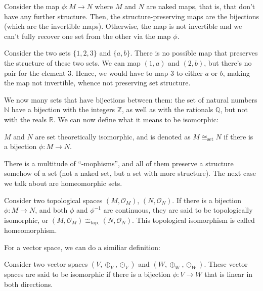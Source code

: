 Consider the map $\phi : M \longrightarrow N$ where $M$ and $N$ are naked maps, that is, that don't have any further structure. Then, the structure-preserving maps are the bijections (which are the invertible maps). Otherwise, the map is not invertible and we can't fully recover one set from the other via the map $\phi$.

\begin{example}
    Consider the two sets $\{1,2,3\}$ and $\{a,b\}$. There is no possible map that preserves the structure of these two sets. We can map $(1,a)$ and $(2,b)$, but there's no pair for the element $3$. Hence, we would have to map 3 to either $a$ or $b$, making the map not invertible, whence not preserving set structure.
    \qedwhite
\end{example}

We now many sets that have bijections between them: the set of natural numbers $\mathbb{N}$ have a bijection with the integers $\mathbb{Z}$, as well as with the rationals $\mathbb{Q}$, but not with the reals $\mathbb{R}$. We can now define what it means to be isomorphic:

\begin{definition}
    $M$ and $N$ are set theoretically isomorphic, and is denoted as $M \cong_{\text{set}} N$ if there is a bijection $\phi : M \longrightarrow N$.
\end{definition}

There is a multitude of ``-mophisms'', and all of them preserve a structure somehow of a set (not a naked set, but a set with more structure). The next case we talk about are homeomorphic sets.

\begin{definition}
    Consider two topological spaces $(M, \mathcal{O}_M)$, $(N, \mathcal{O}_N)$. If there is a bijection $\phi : M \longrightarrow N$, and both $\phi$ and $\phi^{-1}$ are continuous, they are said to be topologically isomorphic, or $(M, \mathcal{O}_M) \cong_{\text{top.}} (N, \mathcal{O}_N)$. This topological isomorphism is called homeomorphism.
\end{definition}

For a vector space, we can do a similiar definition:

\begin{definition}
    Consider two vector spaces $(V, \oplus_V, \odot_V)$ and $(W, \oplus_W, \odot_W)$. These vector spaces are said to be isomorphic if there is a bijection $\phi : V \longrightarrow W$ that is linear in both directions.
\end{definition}

